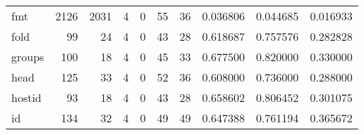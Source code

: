 \begin{longtable}{lrrrrrrrrr}
fmt       &                                               2126 &                                               2031 &                                                  4 &                                                  0 &                                                 55 &                                                 36 &                                           0.036806 &                               0.044685 &                             0.016933 \\
fold      &                                                 99 &                                                 24 &                                                  4 &                                                  0 &                                                 43 &                                                 28 &                                           0.618687 &                               0.757576 &                             0.282828 \\
groups    &                                                100 &                                                 18 &                                                  4 &                                                  0 &                                                 45 &                                                 33 &                                           0.677500 &                               0.820000 &                             0.330000 \\
head      &                                                125 &                                                 33 &                                                  4 &                                                  0 &                                                 52 &                                                 36 &                                           0.608000 &                               0.736000 &                             0.288000 \\
hostid    &                                                 93 &                                                 18 &                                                  4 &                                                  0 &                                                 43 &                                                 28 &                                           0.658602 &                               0.806452 &                             0.301075 \\
id        &                                                134 &                                                 32 &                                                  4 &                                                  0 &                                                 49 &                                                 49 &                                           0.647388 &                               0.761194 &                             0.365672 \\

\end{longtable}
